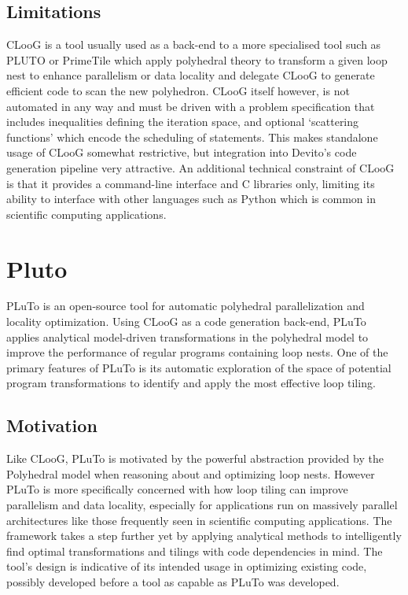 \documentclass[a4paper,12pt,twoside]{report}
\begin{document}
\subsection{Limitations}
CLooG is a tool usually used as a back-end to a more specialised tool such as PLUTO \cite{pluto} or PrimeTile \cite{primetile} which
apply polyhedral theory to transform a given loop nest to enhance parallelism or data locality and delegate CLooG to generate
efficient code to scan the new polyhedron. CLooG itself however, is not automated in any way and must be driven with a problem
specification that includes inequalities defining the iteration space, and optional `scattering functions' which encode the scheduling
of statements. This makes standalone usage of CLooG somewhat restrictive, but integration into Devito's code generation pipeline
very attractive. An additional technical constraint of CLooG is that it provides a command-line interface and C libraries only,
limiting its ability to interface with other languages such as Python which is common in scientific computing applications.

\section{Pluto}
PLuTo \cite{pluto} is an open-source tool for automatic polyhedral parallelization and locality optimization. Using CLooG as a code generation
back-end, PLuTo applies analytical model-driven transformations in the polyhedral model \cite{ram-polyhedral} to improve the performance
of regular programs containing loop nests. One of the primary features of PLuTo is its automatic exploration of the space
of potential program transformations to identify and apply the most effective loop tiling.

\subsection{Motivation}
Like CLooG, PLuTo is motivated by the powerful abstraction provided by the Polyhedral model when reasoning about and optimizing loop
nests. However PLuTo is more specifically concerned with how loop tiling can improve parallelism and data locality, especially
for applications run on massively parallel architectures like those frequently seen in scientific computing applications. The framework
takes a step further yet by applying analytical methods to intelligently find optimal transformations and tilings with code dependencies in mind.
The tool's design is indicative of its intended usage in optimizing existing code, possibly developed before a tool as capable as PLuTo was developed.
\end{document}
